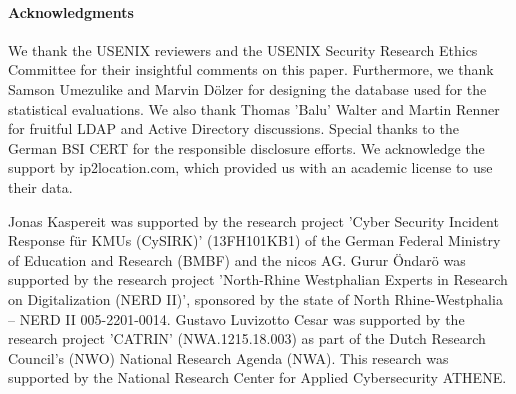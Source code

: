 \paragraph{Acknowledgments}

We thank the USENIX reviewers and the USENIX Security Research Ethics Committee for their insightful comments on this paper. Furthermore, we thank Samson Umezulike and Marvin Dölzer for designing the database used for the statistical evaluations. We also thank Thomas 'Balu' Walter and Martin Renner for fruitful LDAP and Active Directory discussions. Special thanks to the German BSI CERT for the responsible disclosure efforts. We acknowledge the support by ip2location.com, which provided us with an academic license to use their data.

Jonas Kaspereit was supported by the research project 'Cyber Security Incident Response für KMUs (CySIRK)' (13FH101KB1) of the German Federal Ministry of Education and Research (BMBF) and the nicos AG.
Gurur Öndarö was supported by the research project 'North-Rhine Westphalian Experts in Research on Digitalization (NERD II)', sponsored by the state of North Rhine-Westphalia – NERD II 005-2201-0014.
Gustavo Luvizotto Cesar was supported by the research project 'CATRIN' (NWA.1215.18.003) as part of the Dutch Research Council's (NWO) National Research Agenda (NWA).
This research was supported by the National Research Center for Applied Cybersecurity ATHENE.